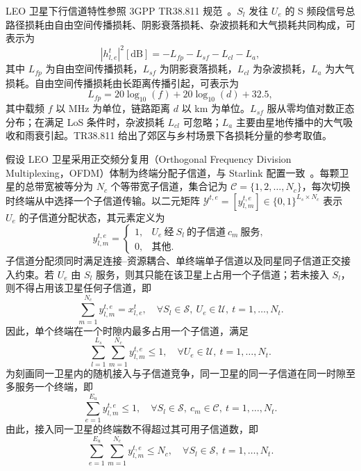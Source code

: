 LEO 卫星下行信道特性参照 3GPP TR38.811 规范~\cite{3gpp-38811}。$S_l$ 发往 $U_e$ 的 S 频段信号总路径损耗由自由空间传播损耗、阴影衰落损耗、杂波损耗和大气损耗共同构成，可表示为
\begin{equation}\label{eq:ch3_pathloss}
|h_{l,e}^t|^2[\text{dB}]=-L_{fp}-L_{sf}-L_{cl}-L_a,
\end{equation}
其中 $L_{fp}$ 为自由空间传播损耗，$L_{sf}$ 为阴影衰落损耗，$L_{cl}$ 为杂波损耗，$L_a$ 为大气损耗。自由空间传播损耗由长距离传播引起，可表示为
\begin{equation}\label{eq:ch3_lfp}
L_{fp}=20\log_{10}(f)+20\log_{10}(d)+32.5,
\end{equation}
其中载频 $f$ 以 MHz 为单位，链路距离 $d$ 以 km 为单位。$L_{sf}$ 服从零均值对数正态分布；在满足 LoS 条件时，杂波损耗 $L_{cl}$ 可忽略；$L_a$ 主要由星地传播中的大气吸收和雨衰引起。TR38.811 给出了郊区与乡村场景下各损耗分量的参考取值。

假设 LEO 卫星采用正交频分复用（Orthogonal Frequency Division Multiplexing，OFDM）体制为终端分配子信道，与 Starlink 配置一致~\cite{neinavaie-StarlinkOFDM-TAES24}。每颗卫星的总带宽被等分为 $N_c$ 个等带宽子信道，集合记为 $\mathcal{C}=\{1,2,\dots,N_c\}$，每次切换时终端从中选择一个子信道传输。以二元矩阵 $\mathcal{Y}^{t,e}=[y_{l,m}^{t,e}]\in\{0,1\}^{L_s\times N_c}$ 表示 $U_e$ 的子信道分配状态，其元素定义为
\begin{equation}\label{eq:ch3_sc_alloc}
y_{l,m}^{t,e}=
\begin{cases}
1, & U_e~\text{经}~S_l~\text{的子信道}~c_m~\text{服务},\\[2pt]
0, & \text{其他}.
\end{cases}
\end{equation}
子信道分配须同时满足连接--资源耦合、单终端单子信道以及同星同子信道正交接入约束。若 $U_e$ 由 $S_l$ 服务，则其只能在该卫星上占用一个子信道；若未接入 $S_l$，则不得占用该卫星任何子信道，即
\begin{equation}\label{eq:ch3_sc_coupling}
\sum_{m=1}^{N_c}y_{l,m}^{t,e}=x_{l,e}^t,\quad\forall S_l\in\mathcal{S},~U_e\in\mathcal{U},~t=1,\dots,N_t.
\end{equation}
因此，单个终端在一个时隙内最多占用一个子信道，满足
\begin{equation}\label{eq:ch3_ue_one_sc}
\sum_{l=1}^{L_s}\sum_{m=1}^{N_c}y_{l,m}^{t,e}\leqslant 1,\quad\forall U_e\in\mathcal{U},~t=1,\dots,N_t.
\end{equation}
为刻画同一卫星内的随机接入与子信道竞争，同一卫星的同一子信道在同一时隙至多服务一个终端，即
\begin{equation}\label{eq:ch3_sc_orthogonal}
\sum_{e=1}^{E_u}y_{l,m}^{t,e}\leqslant 1,\quad\forall S_l\in\mathcal{S},~c_m\in\mathcal{C},~t=1,\dots,N_t.
\end{equation}
由此，接入同一卫星的终端数不得超过其可用子信道数，即
\begin{equation}\label{eq:ch3_sc_cap}
\sum_{e=1}^{E_u}\sum_{m=1}^{N_c}y_{l,m}^{t,e}\leqslant N_c,\quad\forall S_l\in\mathcal{S},~t=1,\dots,N_t.
\end{equation}

